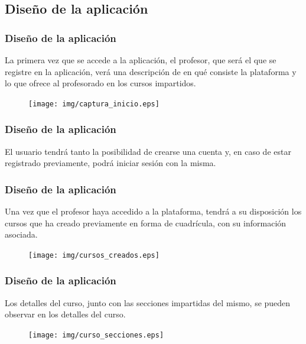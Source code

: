 \documentclass{beamer}
\begin{document}
\subsection{Diseño de la aplicación}
\begin{frame}
\frametitle{Diseño de la aplicación}

La primera vez que se accede a la aplicación, el profesor, que será el que se registre en la aplicación, verá una descripción de en qué consiste la plataforma y lo que ofrece al profesorado
en los cursos impartidos.

\begin{figure}
    \texttt{[image: img/captura\_inicio.eps]}
\end{figure}

\end{frame}
\begin{frame}
\frametitle{Diseño de la aplicación}

El usuario tendrá tanto la posibilidad de crearse una cuenta y, en caso de estar registrado previamente, podrá iniciar sesión con la misma.

\begin{figure}[!th]%
    \centering
    \qquad
\end{figure}

\end{frame}
\begin{frame}
\frametitle{Diseño de la aplicación}

Una vez que el profesor haya accedido a la plataforma, tendrá a su disposición los cursos que ha creado previamente en forma de cuadrícula, con su información asociada.

\begin{figure}
    \texttt{[image: img/cursos\_creados.eps]}
\end{figure}

\end{frame}
\begin{frame}
\frametitle{Diseño de la aplicación}

Los detalles del curso, junto con las secciones impartidas del mismo, se pueden observar en los detalles del curso.

\begin{figure}
    \texttt{[image: img/curso\_secciones.eps]}
\end{figure}

\end{frame}
\end{document}
